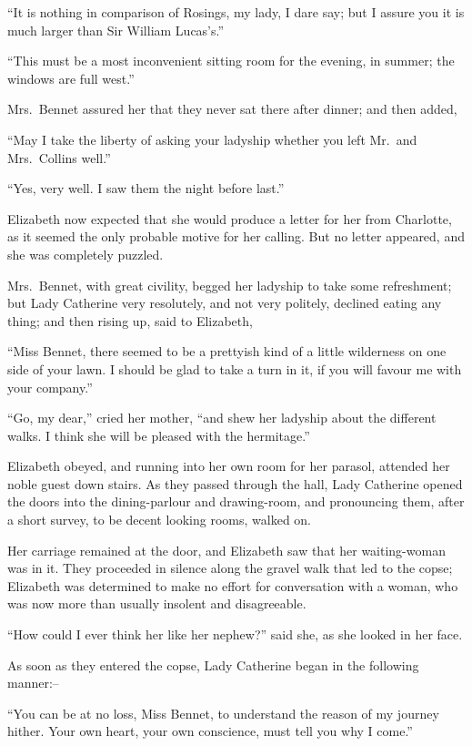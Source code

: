 “It is nothing in comparison of Rosings, my lady,
I dare say; but I assure you it is much larger than
Sir William Lucas’s.”

“This must be a most inconvenient sitting room for
the evening, in summer; the windows are full west.”

Mrs.\ Bennet assured her that they never sat there after
dinner; and then added,

“May I take the liberty of asking your ladyship
whether you left Mr.\ and Mrs.\ Collins well.”

“Yes, very well. I saw them the night before last.”

Elizabeth now expected that she would produce a letter
for her from Charlotte, as it seemed the only probable
motive for her calling. But no letter appeared, and she
was completely puzzled.

Mrs.\ Bennet, with great civility, begged her ladyship
to take some refreshment; but Lady Catherine very
resolutely, and not very politely, declined eating any
thing; and then rising up, said to Elizabeth,

“Miss Bennet, there seemed to be a prettyish kind of
a little wilderness on one side of your lawn. I should be
glad to take a turn in it, if you will favour me with your
company.”

“Go, my dear,” cried her mother, “and shew her
ladyship about the different walks. I think she will be
pleased with the hermitage.”

Elizabeth obeyed, and running into her own room for
her parasol, attended her noble guest down stairs. As
they passed through the hall, Lady Catherine opened the
doors into the dining-parlour and drawing-room, and
pronouncing them, after a short survey, to be decent
looking rooms, walked on.

Her carriage remained at the door, and Elizabeth saw
that her waiting-woman was in it. They proceeded in
silence along the gravel walk that led to the copse; Elizabeth
was determined to make no effort for conversation
with a woman, who was now more than usually insolent
and disagreeable.

“How could I ever think her like her nephew?” said
she, as she looked in her face.

As soon as they entered the copse, Lady Catherine began
in the following manner:--

“You can be at no loss, Miss Bennet, to understand the
reason of my journey hither. Your own heart, your own
conscience, must tell you why I come.”

